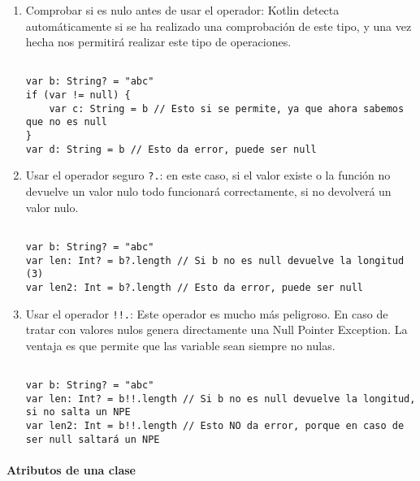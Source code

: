 \begin{enumerate}
	\item Comprobar si es nulo antes de usar el operador: Kotlin detecta automáticamente si se ha realizado una comprobación de este tipo, y una vez hecha nos permitirá realizar este tipo de operaciones.
	
\begin{verbatim}

var b: String? = "abc"
if (var != null) {
	var c: String = b // Esto si se permite, ya que ahora sabemos que no es null
}
var d: String = b // Esto da error, puede ser null

\end{verbatim}

	\item Usar el operador seguro \texttt{?.}: en este caso, si el valor existe o la función no devuelve un valor nulo todo funcionará correctamente, si no devolverá un valor nulo.
	
\begin{verbatim}

var b: String? = "abc"
var len: Int? = b?.length // Si b no es null devuelve la longitud (3)
var len2: Int = b?.length // Esto da error, puede ser null

\end{verbatim}

	\item Usar el operador \texttt{!!.}: Este operador es mucho más peligroso. En caso de tratar con valores nulos genera directamente una Null Pointer Exception. La ventaja es que permite que las variable sean siempre no nulas.
	
\begin{verbatim}

var b: String? = "abc"
var len: Int? = b!!.length // Si b no es null devuelve la longitud, si no salta un NPE
var len2: Int = b!!.length // Esto NO da error, porque en caso de ser null saltará un NPE

\end{verbatim}

\end{enumerate}

\paragraph{Atributos de una clase}

